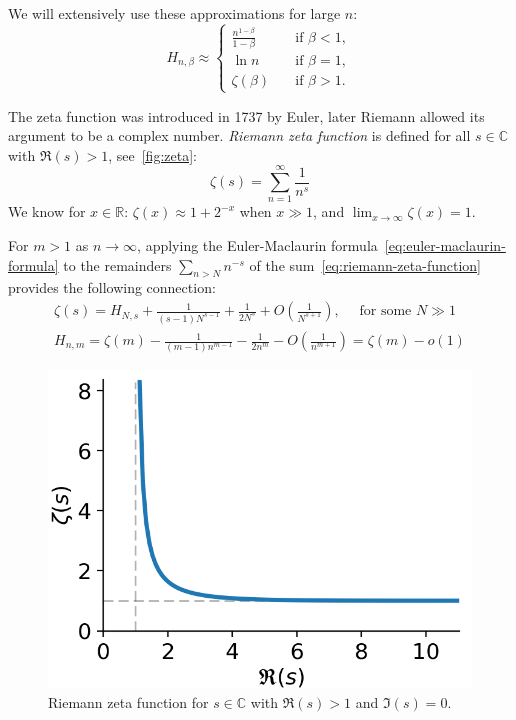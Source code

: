 We will extensively use these approximations for large $n$:
\begin{equation}
    H_{n,\beta}\approx
    \begin{cases}
        \frac{n^{1-\beta}}{1-\beta} & \quad \text{if } \beta<1,\\
        \ln n & \quad \text{if } \beta=1,\\
        \zeta(\beta) & \quad \text{if } \beta>1.
    \end{cases}
\end{equation}

The zeta function was introduced in 1737 by Euler, later Riemann allowed its argument to be a complex number.
\textit{Riemann zeta function} is defined for all $s\in\mathbb{C}$ with $\Re(s)>1$, see~\autoref{fig:zeta}:
\begin{equation}
    \label{eq:riemann-zeta-function}
    \zeta(s)=\sum_{n=1}^{\infty}\frac{1}{n^s}
\end{equation}
We know for $x\in\mathbb{R}$: $\zeta(x)\approx 1+2^{-x}$ when $x\gg 1$,
and $\lim_{x\to\infty}\zeta(x)=1$.

For $m>1$ as $n\to\infty$, applying the Euler-Maclaurin formula~\eqref{eq:euler-maclaurin-formula}
to the remainders $\sum_{n>N}{n^{-s}}$ of the sum~\eqref{eq:riemann-zeta-function}
provides the following connection:
\begin{gather}
    \zeta(s)=H_{N,s}+\frac{1}{(s-1)N^{s-1}}+\frac{1}{2N^s}+O\left(\frac{1}{N^{s+1}}\right),\quad\text{ for some }N\gg1\\
    H_{n,m}=\zeta(m)-\frac{1}{(m-1)n^{m-1}}-\frac{1}{2n^m}-O\left(\frac{1}{n^{m+1}}\right)
    =\zeta(m)-o(1)
\end{gather}

\begin{figure}
    \centering
    \includegraphics[scale=0.75]{images/generated/zeta}
    \caption[Riemann zeta function.]{Riemann zeta function for $s\in\mathbb{C}$ with $\Re(s)>1$ and $\Im(s)=0$.}
    \label{fig:zeta}
\end{figure}


